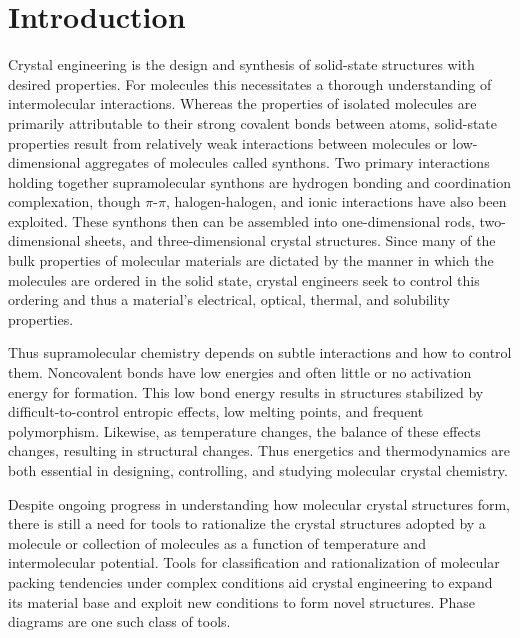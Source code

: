 \documentclass[preprint]{iucr}              %
\begin{document}
\pagebreak

\section{Introduction}

Crystal engineering is the design and synthesis of solid-state structures with desired properties.  For molecules this necessitates a thorough understanding of intermolecular interactions.  Whereas the properties of isolated molecules are primarily attributable to their strong covalent bonds between atoms, solid-state properties result from relatively weak interactions between molecules or low-dimensional aggregates of molecules called synthons.  Two primary interactions holding together supramolecular synthons are hydrogen bonding and coordination complexation, though $\pi$-$\pi$, halogen-halogen, and ionic interactions have also been exploited\cite{Thalladi96}. These synthons then can be assembled into one-dimensional rods, two-dimensional sheets, and three-dimensional crystal structures. Since many of the bulk properties of molecular materials are dictated by the manner in which the molecules are ordered in the solid state, crystal engineers seek to control this ordering and thus a material's electrical, optical, thermal, and solubility properties\cite{Desiraju89,Braga99,Bassoul00,Lommerse00,Holman01b,Moulton01,Motherwell02}.  

Thus supramolecular chemistry depends on subtle interactions and how to control them.  Noncovalent bonds have low energies and often little or no activation energy for formation. This low bond energy results in structures stabilized by difficult-to-control entropic effects, low melting points, and frequent polymorphism. Likewise, as temperature changes, the balance of these effects changes, resulting in structural changes\cite{Neumann03}.  Thus energetics and thermodynamics are both essential in designing, controlling, and studying molecular crystal chemistry. 

Despite ongoing progress in understanding how molecular crystal structures form, there is still a need for tools to rationalize the crystal structures adopted by a molecule or collection of molecules as a function of temperature and intermolecular potential.  Tools for classification and rationalization of molecular packing tendencies under complex conditions aid crystal engineering to expand its material base and exploit new conditions to form novel structures.  Phase diagrams are one such class of tools.
\end{document}
